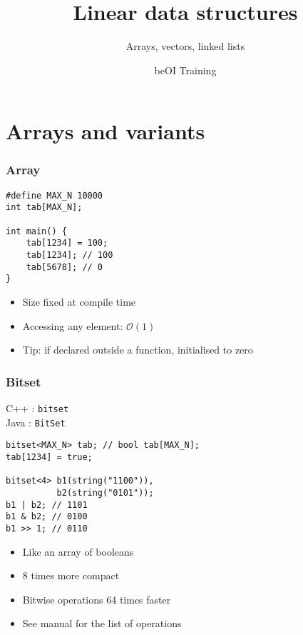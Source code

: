 \documentclass[12pt]{beamer}
\title{Linear data structures}
\subtitle{Arrays, vectors, linked lists}
\author{beOI Training}
\institute{\texttt{[image: ../share/beoi-logo]}}
\newcommand{\bigoh}[1]{\mathcal{O}\left(#1\right)}
\newcommand{\constant}{\bigoh{1}}
\begin{document}
\frame{\titlepage}

\section{Arrays and variants}

\begin{frame}[fragile]
\frametitle{Array}
\begin{lstlisting}
#define MAX_N 10000
int tab[MAX_N];

int main() {
    tab[1234] = 100;
    tab[1234]; // 100
    tab[5678]; // 0
}
\end{lstlisting}
\begin{itemize}
\item Size fixed at compile time
\item Accessing any element: $\constant$
\item Tip: if declared outside a function, initialised to zero
\end{itemize}
\end{frame}

\begin{frame}[fragile]
\frametitle{Bitset}
C++ : \texttt{bitset} \\
Java : \texttt{BitSet}
\begin{lstlisting}
bitset<MAX_N> tab; // bool tab[MAX_N];
tab[1234] = true;

bitset<4> b1(string("1100")),
          b2(string("0101"));
b1 | b2; // 1101
b1 & b2; // 0100
b1 >> 1; // 0110
\end{lstlisting}
\begin{itemize}
\item Like an array of booleans
\item 8 times more compact
\item Bitwise operations 64 times faster
\item See manual for the list of operations
\end{itemize}
\end{frame}
\end{document}
